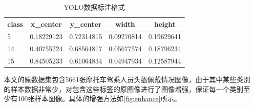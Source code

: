 \begin{table}[htb]
      \centering
      \caption[目标数据]{YOLO数据标注格式\label{tab:format}}
      \begin{tabular}{lrrrr}
          \toprule
          \multicolumn{1}{c}{class} & \multicolumn{1}{c}{x\_center} & \multicolumn{1}{c}{y\_center} & \multicolumn{1}{c}{width} & \multicolumn{1}{c}{height} \\
          \midrule
          5 & 0.18229123 & 0.72314815 & 0.09270814 & 0.19629641 \\
          14 & 0.40755224 & 0.68564817 & 0.05677574 & 0.18796234 \\
          15 & 0.84505233 & 0.61064834 & 0.04947934 & 0.12587944 \\
          \bottomrule
      \end{tabular}
\end{table}


本文的原数据集包含5661张摩托车驾乘人员头盔佩戴情况图像，由于其中某些类别的样本数据非常少，对包含这些标签的原图像进行了图像增强，保证每一个类别至少有100张样本图像。具体的增强方法如\ref{fig:enhance}所示。

